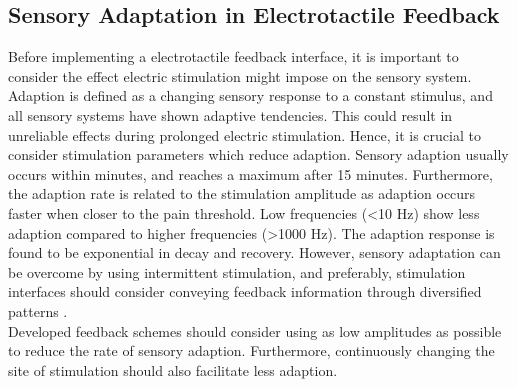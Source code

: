 \subsection{Sensory Adaptation in Electrotactile Feedback}

Before implementing a electrotactile feedback interface, it is important to consider the effect electric stimulation might impose on the sensory system. \\
Adaption is defined as a changing sensory response to a constant stimulus, and all sensory systems have shown adaptive tendencies. This could result in unreliable effects during prolonged electric stimulation. Hence, it is crucial to consider stimulation parameters which reduce adaption. Sensory adaption usually occurs within minutes, and reaches a maximum after 15 minutes. Furthermore, the adaption rate is related to the stimulation amplitude as adaption occurs faster when closer to the pain threshold. Low frequencies (<10 Hz) show less adaption compared to higher frequencies (>1000 Hz). The adaption response is found to be exponential in decay and recovery. \cite{Buma2007,Szeto1982} 
However, sensory adaptation can be overcome by using intermittent stimulation, and preferably, stimulation interfaces should consider conveying feedback information through diversified patterns \cite{Szeto1982,Dosen2016}. \\
Developed feedback schemes should consider using as low amplitudes as possible to reduce the rate of sensory adaption. Furthermore, continuously changing the site of stimulation should also facilitate less adaption. 



